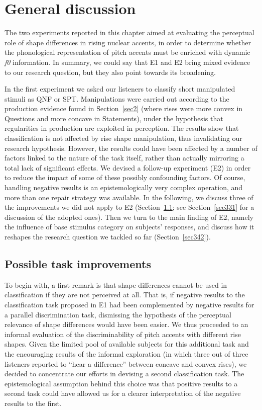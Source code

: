 \section{General discussion}\label{sec34}
The two experiments reported in this chapter aimed at evaluating the perceptual role of shape differences in rising nuclear accents, in order to determine whether the phonological representation of pitch accents must be enriched with dynamic \textit{f0} information. In summary, we could say that E1 and E2 bring mixed evidence to our research question, but they also point towards its broadening. 

In the first experiment we asked our listeners to classify short manipulated stimuli as QNF or SPT. Manipulations were carried out according to the production evidence found in Section~\ref{sec2} (where rises were more convex in Questions and more concave in Statements), under the hypothesis that regularities in production are exploited in perception. The results show that classification is not affected by rise shape manipulation, thus invalidating our research hypothesis. However, the results could have been affected by a number of factors linked to the nature of the task itself, rather than actually mirroring a total lack of significant effects. We devised a follow-up experiment (E2) in order to reduce the impact of some of these possibly confounding factors. Of course, handling negative results is an epistemologically very complex operation, and more than one repair strategy was available. In the following, we discuss three of the improvements we did not apply to E2 (Section~\ref{sec341}; see Section~\ref{sec331} for a discussion of the adopted ones). Then we turn to the main finding of E2, namely the influence of base stimulus category on subjects' responses, and discuss how it reshapes the research question we tackled so far (Section~\ref{sec342}).

\subsection{Possible task improvements}\label{sec341}
To begin with, a first remark is that shape differences cannot be used in classification if they are not perceived at all. That is, if negative results to the classification task proposed in E1 had been complemented by negative results for a parallel discrimination task, dismissing the hypothesis of the perceptual relevance of shape differences would have been easier. We thus proceeded to an informal evaluation of the discriminability of pitch accents with different rise shapes. Given the limited pool of available subjects for this additional task and the encouraging results of the informal exploration (in which three out of three listeners reported to ``hear a difference'' between concave and convex rises), we decided to concentrate our efforts in devising a second classification task. The epistemological assumption behind this choice was that positive results to a second task could have allowed us for a clearer interpretation of the negative results to the first.

